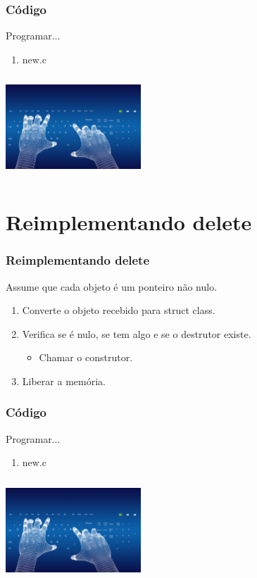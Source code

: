 \documentclass{beamer}
\begin{document}
\begin{frame}
  \frametitle{Código}
  Programar...
  \begin{enumerate}
   \item new.c
  \end{enumerate}

  \begin{center}
    \includegraphics[height = 1.5in, width = 2in]{image/programming.jpg}
  \end{center}
\end{frame}

\section{Reimplementando delete}
\begin{frame}
 \frametitle{Reimplementando delete}
 Assume que cada objeto é um ponteiro não nulo.
 \begin{enumerate}
  \item<1-> Converte o objeto recebido para struct class.
  \item<2-> Verifica se é nulo, se tem algo e se o destrutor existe.
    \begin{itemize}
     \item<3-> Chamar o construtor.
    \end{itemize}

  \item<4-> Liberar a memória.
 \end{enumerate}

\end{frame}

\begin{frame}
  \frametitle{Código}
  Programar...
  \begin{enumerate}
   \item new.c
  \end{enumerate}

  \begin{center}
    \includegraphics[height = 1.5in, width = 2in]{image/programming.jpg}
  \end{center}
\end{frame}
\end{document}
